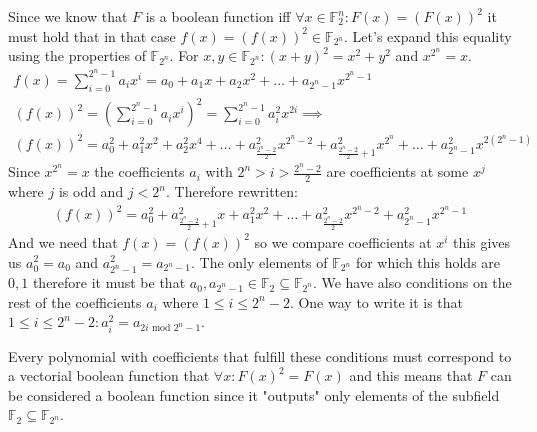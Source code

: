\documentclass[12pt, a4paper]{article}
\begin{document}
Since we know that $F$ is a boolean function iff $\forall x \in \mathbb{F}_2^n: F(x)=(F(x))^2$ it must hold that in that case $f(x) = (f(x))^2 \in \mathbb{F}_{2^n}$. Let's expand this equality using the properties of $\mathbb{F}_{2^n}$. For $x,y \in \mathbb{F}_{2^n}: (x+y)^2 = x^2+y^2$ and $x^{2^n} = x$.
\begin{gather*}
f(x) = \sum\limits_{i = 0}^{2^n-1}a_ix^i = a_0 + a_1x + a_2x^2 + \dots + a_{2^n-1}x^{2^n-1} \\
(f(x))^2 = \left( \sum\limits_{i = 0}^{2^n-1}a_ix^i \right)^2 = \sum\limits_{i = 0}^{2^n-1}a_i^2x^{2i} \implies\\
(f(x))^2 = a_0^2 + a_1^2x^2 + a_2^2x^4 + \dots + a_{\frac{2^n-2}{2}}^2x^{2^n-2} + a_{\frac{2^n-2}{2}+1}^2x^{2^n} + \dots + a_{2^n-1}^2x^{2(2^n-1)}
\end{gather*}
Since $x^{2^n} = x$ the coefficients $a_i$ with $2^n > i > \frac{2^n-2}{2}$ are coefficients at some $x^j$ where $j$ is odd and $j < 2^n$. Therefore rewritten:
\begin{gather*}
(f(x))^2 = a_0^2 + a_{\frac{2^n-2}{2}+1}^2x + a_1^2x^2 + \dots + a_{\frac{2^n-2}{2}}^2x^{2^n-2} + a_{2^n-1}^2x^{2^n-1}
\end{gather*}
And we need that $f(x) = (f(x))^2$ so we compare coefficients at $x^i$ this gives us $a_0^2 = a_0$ and $a_{2^n-1}^2 = a_{2^n-1}$. The only elements of $\mathbb{F}_{2^n}$ for which this holds are $0,1$ therefore it must be that $a_0,a_{2^n-1} \in \mathbb{F}_2 \subseteq \mathbb{F}_{2^n}$. We have also conditions on the rest of the coefficients $a_i$ where $1 \leq i \leq 2^n-2$. One way to write it is that $1 \leq i \leq 2^n-2: a_i^2=a_{2i \text{ mod } 2^n-1}$.

Every polynomial with coefficients that fulfill these conditions must correspond to a vectorial boolean function that $\forall x: F(x)^2=F(x)$ and this means that $F$ can be considered a boolean function since it "outputs" only elements of the subfield $\mathbb{F}_2 \subseteq \mathbb{F}_{2^n}$.
\end{document}

